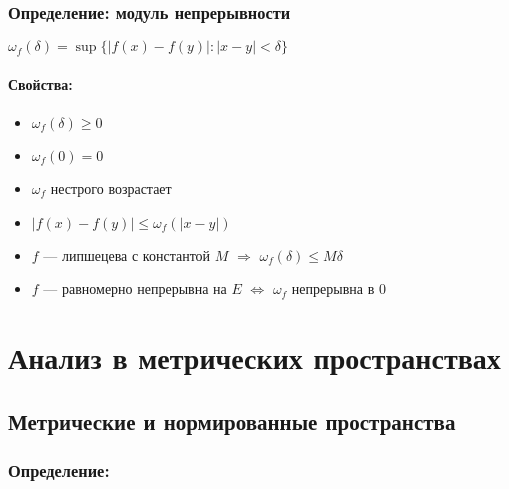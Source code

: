 \documentclass[12pt]{report} %
\begin{document}
\newpage
\subsection*{\textbf{Определение: модуль непрерывности}}
\begin{spacing}{1.3}
$\omega_{f}(\delta) = \sup\{|f(x) - f(y)| : |x - y| < \delta \}$
\subsubsection*{\textbf{Свойства:}}
\begin{itemize}
  \item $\omega_{f}{(\delta)} \geqslant 0$
  \item $\omega_{f}{(0)} = 0$
  \item $\omega_{f}$ нестрого возрастает
  \item $ |f(x) - f(y)| \leqslant \omega_{f}{(|x - y|)}$
  \item $f$ --- липшецева с константой $M$ $\Rightarrow$ $\omega_{f}(\delta) \leqslant M\delta$
  \item $f$ --- равномерно непрерывна на $E$ $\Leftrightarrow$ $\omega_{f}$ непрерывна в 0
\end{itemize}
\end{spacing}

\chapter*{Анализ в метрических пространствах}

\section*{Метрические и нормированные пространства}
\subsection*{Определение:}
\end{document}
